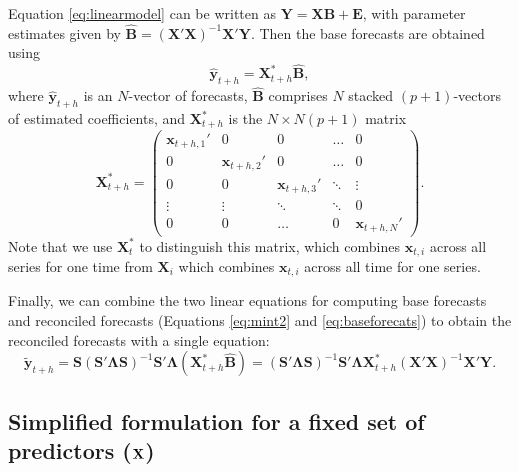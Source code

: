 \documentclass[11pt,a4paper,]{article}
\begin{document}
Equation \eqref{eq:linearmodel} can be written as
\(\bm{Y} = \bm{X} \bm{B} + \bm{E}\), with parameter estimates given by
\(\hat{\bm{B}} = (\bm{X}'\bm{X})^{-1} \bm{X}'\bm{Y}\). Then the base
forecasts are obtained using \begin{equation}\label{eq:baseforecats}
\hat{\bm{y}}_{t+h} = \bm{X}_{t+h}^* \hat{\bm{B}},
\end{equation} where \(\hat{\bm{y}}_{t+h}\) is an \(N\)-vector of
forecasts, \(\hat{\bm{B}}\) comprises \(N\) stacked \((p+1)\)-vectors of
estimated coefficients, and \(\bm{X}_{t+h}^*\) is the \(N\times N(p+1)\)
matrix \pagebreak[3]\begin{equation}
\bm{X}_{t+h}^* =
\begin{pmatrix}
\bm{x}_{t+h,1}' & 0                & 0                & \dots  & 0\\
0               & \bm{x}_{t+h,2}' & 0                & \dots  & 0\\
0               & 0                & \bm{x}_{t+h,3}' & \ddots & \vdots \\
\vdots          & \vdots           & \ddots           & \ddots & 0\\
0               & 0                & \dots            & 0      & \bm{x}_{t+h,N}'
\end{pmatrix}.
\end{equation} Note that we use \(\bm{X}^*_{t}\) to distinguish this
matrix, which combines \(\bm{x}_{t,i}\) across all series for one time
from \(\bm{X}_i\) which combines \(\bm{x}_{t,i}\) across all time for
one series.

Finally, we can combine the two linear equations for computing base
forecasts and reconciled forecasts (Equations \eqref{eq:mint2} and
\eqref{eq:baseforecats}) to obtain the reconciled forecasts with a single
equation: \begin{equation}\label{eq:singlestep}
\tilde{\bm{y}}_{t+h} = \bm{S}(\bm{S}'\bm{\Lambda}\bm{S})^{-1}\bm{S}'\bm{\Lambda}
                        (\bm{X}_{t+h}^* \hat{\bm{B}})
                        = (\bm{S}'\bm{\Lambda}\bm{S})^{-1}\bm{S}'\bm{\Lambda}
                        \bm{X}_{t+h}^* (\bm{X}'\bm{X})^{-1} \bm{X}'\bm{Y}.
\end{equation}

\hypertarget{simplified-formulation-for-a-fixed-set-of-predictors-bf-x}{%
\subsection{\texorpdfstring{Simplified formulation for a fixed set of
predictors (\(\bf {X}\))
\label{sec:proposedapproach2}}{Simplified formulation for a fixed set of predictors (\textbackslash{}bf \{X\}) }}\label{simplified-formulation-for-a-fixed-set-of-predictors-bf-x}}
\end{document}
